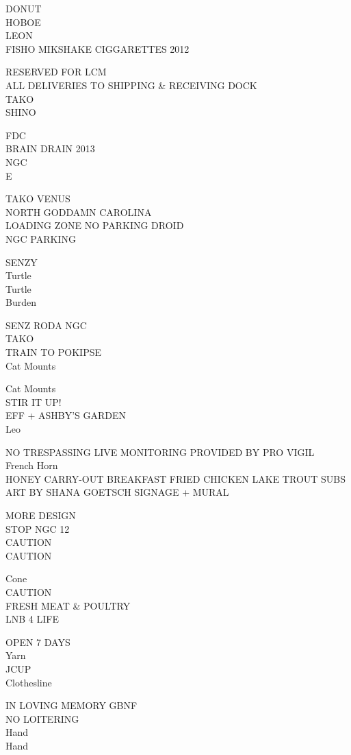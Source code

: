 \documentclass[10pt,letterpaper]{article}
\begin{document}
DONUT\\
HOBOE\\
LEON\\
FISHO MIKSHAKE CIGGARETTES 2012

RESERVED FOR LCM\\
ALL DELIVERIES TO SHIPPING \& RECEIVING DOCK\\
TAKO\\
SHINO

FDC\\
BRAIN DRAIN 2013\\
NGC\\
E

TAKO VENUS\\
NORTH GODDAMN CAROLINA\\
LOADING ZONE NO PARKING DROID\\
NGC PARKING

SENZY\\
Turtle\\
Turtle\\
Burden

SENZ RODA NGC\\
TAKO\\
TRAIN TO POKIPSE\\
Cat Mounts

Cat Mounts\\
STIR IT UP!\\
EFF + ASHBY'S GARDEN\\
Leo

NO TRESPASSING LIVE MONITORING PROVIDED BY PRO VIGIL\\
French Horn\\
HONEY CARRY{-}OUT BREAKFAST FRIED CHICKEN LAKE TROUT SUBS\\
ART BY SHANA GOETSCH SIGNAGE + MURAL

MORE DESIGN\\
STOP NGC 12\\
CAUTION\\
CAUTION

Cone\\
CAUTION\\
FRESH MEAT \& POULTRY\\
LNB 4 LIFE

OPEN 7 DAYS\\
Yarn\\
JCUP\\
Clothesline

IN LOVING MEMORY GBNF\\
NO LOITERING\\
Hand\\
Hand
\end{document}
